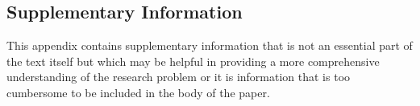 \documentclass[sn-nature]{sn-jnl}%
\theoremstyle{thmstyleone}%
\theoremstyle{thmstyletwo}%
\theoremstyle{thmstylethree}%
\begin{document}

\begin{appendices}

\section{Supplementary Information}\label{sec:appendix-supplementary-info}

This appendix contains supplementary information that is not an essential part of the text itself but which may be helpful in providing a more comprehensive understanding of the research problem or it is information that is too cumbersome to be included in the body of the paper.




\end{appendices}


\end{document}
